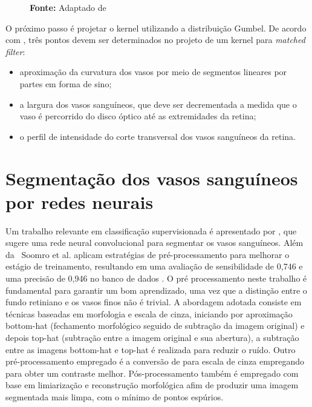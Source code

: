  \begin{figure} [!htb]
 \centering
 \caption{Algoritmo de segmentação de vasos sanguíneos, \cite{Singh2016a} }\label{fig:fluxogramabloodvessels}

\caption*{\textbf{Fonte:} Adaptado de {\cite{Singh2016a}}}
 \end{figure}


O próximo passo é projetar o kernel utilizando a distribuição Gumbel. De acordo com , três pontos devem ser determinados no projeto de um kernel para \textit{matched filter}:
\begin{itemize}
\item aproximação da curvatura dos vasos por meio de  segmentos lineares por partes em forma de sino;
\item a largura dos vasos sanguíneos, que deve ser decrementada a medida que o vaso é percorrido do disco óptico até as extremidades da retina;
\item o perfil de intensidade do corte transversal dos vasos sanguíneos da retina.
\end{itemize}

\section{Segmentação dos vasos sanguíneos por redes neurais}


Um trabalho relevante em classificação supervisionada é apresentado por , que sugere uma rede neural convolucional para segmentar os vasos sanguíneos. Além da \, Soomro et al. aplicam estratégias de pré-processamento para melhorar o estágio de treinamento, resultando em uma avaliação de sensibilidade de 0,746 e uma precisão de 0,946 no banco de dados . O pré processamento neste trabalho é fundamental para garantir um bom aprendizado, uma vez que a distinção  entre o fundo retiniano e os vasos finos não é trivial. A abordagem adotada consiste em técnicas baseadas em morfologia e escala de cinza, iniciando por aproximação bottom-hat (fechamento morfológico seguido de subtração da imagem original) e depois top-hat (subtração entre a imagem original e sua abertura), a subtração entre as imagens bottom-hat e top-hat é realizada para reduzir o ruído. Outro pré-processamento empregado é a conversão de  para escala de cinza empregando  para obter um contraste melhor.  Pós-processamento também é empregado com base em limiarização e reconstrução morfológica afim de produzir uma imagem segmentada mais limpa, com o mínimo de pontos espúrios.

